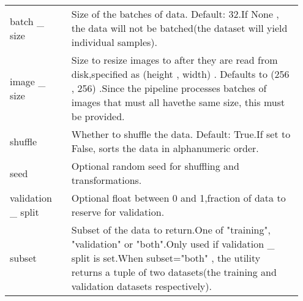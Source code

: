 \documentclass[
	letterpaper, %
	10pt, %
	unnumberedsections, %
	twoside, %
]{LTJournalArticle}
\begin{document}
\begin{table*}[hbt!]
\begin{tabular}{L{0.2\linewidth} L{0.75\linewidth}}
        batch \_ size                 & Size of the batches of data. Default: 32.If None , the data will not be batched(the dataset will yield individual samples).                                                                                                                                                                                                                                                                                                              \\
        image \_ size                 & Size to resize images to after they are read from disk,specified as (height , width) . Defaults to (256 , 256) .Since the pipeline processes batches of images that must all havethe same size, this must be provided.                                                                                                                                                                                                                   \\
        shuffle                       & Whether to shuffle the data. Default: True.If set to False, sorts the data in alphanumeric order.                                                                                                                                                                                                                                                                                                                                        \\
        seed                          & Optional random seed for shuffling and transformations.                                                                                                                                                                                                                                                                                                                                                                                  \\
        validation \_ split           & Optional float between 0 and 1,fraction of data to reserve for validation.                                                                                                                                                                                                                                                                                                                                                               \\
        subset                        & Subset of the data to return.One of "training", "validation" or "both".Only used if validation \_ split is set.When subset="both" , the utility returns a tuple of two datasets(the training and validation datasets respectively).                                                                                                                                                                                                      \\

\end{tabular}
\end{table*}
\end{document}
